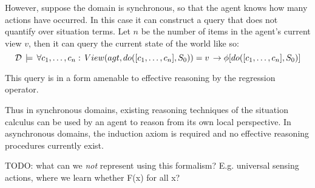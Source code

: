 However, suppose the domain is synchronous, so that the agent knows
how many actions have occurred. In this case it can construct a query
that does not quantify over situation terms. Let $n$ be the number
of items in the agent's current view $v$, then it can query the current
state of the world like so:\[
\mathcal{D}\,\models\,\forall c_{1},\dots,c_{n}:\, View(agt,do([c_{1},\dots,c_{n}],S_{0}))=v\,\rightarrow\phi[do([c_{1},\dots,c_{n}],S_{0})]\]


This query is in a form amenable to effective reasoning by the regression
operator.

Thus in synchronous domains, existing reasoning techniques of the
situation calculus can be used by an agent to reason from its own
local perspective. In asynchronous domains, the induction axiom is
required and no effective reasoning procedures currently exist.

TODO: what can we \emph{not} represent using this formalism? E.g.
universal sensing actions, where we learn whether F(x) for all x?

